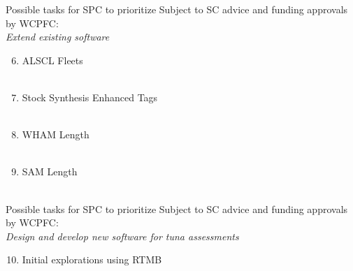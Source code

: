 \documentclass[aspectratio=169,fleqn]{beamer}
\begin{document}

\begin{frame}{Possible tasks for SPC to prioritize}
  Subject to SC advice and funding approvals by WCPFC:\\[3ex]
  {\orange\it Extend existing software}\\[1.5ex]
  \begin{enumerate}\setcounter{enumi}{5}
    \item ALSCL$\,$\raisebox{0.15ex}{+}$\,$Fleets\\
    \\[1.5ex]
    \item Stock Synthesis$\,$\raisebox{0.15ex}{+}$\,$Enhanced Tags\\
    \\[1.5ex]
    \item WHAM$\,$\raisebox{0.15ex}{+}$\,$Length\\
    \\[1.5ex]
    \item SAM$\,$\raisebox{0.15ex}{+}$\,$Length\\
    \\[1.5ex]
  \end{enumerate}
\end{frame}


\begin{frame}{Possible tasks for SPC to prioritize}
  Subject to SC advice and funding approvals by WCPFC:\\[4ex]
  {\orange\it Design and develop new software for tuna assessments}\\[2ex]
  \begin{enumerate}\setcounter{enumi}{9}
    \item Initial explorations using {\darkgreen RTMB}\\
  \end{enumerate}
\end{frame}
\end{document}
